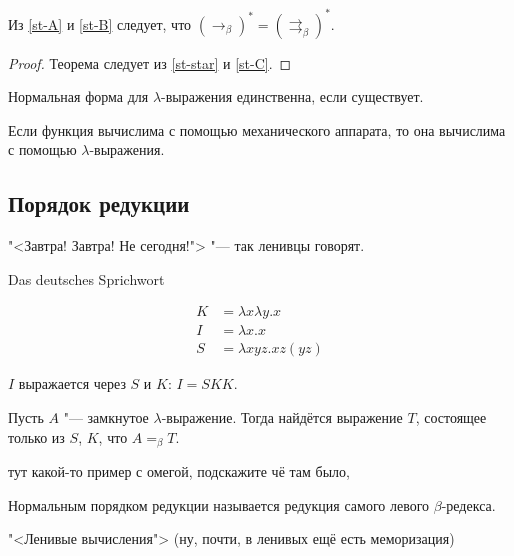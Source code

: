 \begin{statement} \label{st-C}
    Из \ref{st-A} и \ref{st-B} следует, что $(\rightarrow_{\beta})^{*} = (\rightrightarrows_{\beta})^{*}$.
\end{statement}

\begin{proof}
    Теорема  следует из \ref{st-star} и \ref{st-C}.
\end{proof}

\begin{corollary}
    Нормальная форма для $\lambda$-выражения единственна, если существует.
\end{corollary}

\begin{theorem}
    Если функция вычислима с помощью механического аппарата, то она вычислима с помощью $\lambda$-выражения.
\end{theorem}

\subsection{\texorpdfstring{Порядок редукции}{Order of reduction}}
\epigraph{"<Завтра! Завтра! Не сегодня!"> "--- так ленивцы говорят.}{Das deutsches Sprichwort}

\begin{definition}
    \begin{align*}
        K &= \lambda x \lambda y . x \\
        I &= \lambda x . x \\
        S &= \lambda x y z . x z (y z)
    \end{align*}
\end{definition}
$I$ выражается через $S$ и $K$: $I = S K K$.

\begin{statement}
    Пусть $A$ "--- замкнутое $\lambda$-выражение. Тогда найдётся выражение $T$, состоящее только из $S$, $K$, что $A =_{\beta}T$.
\end{statement}

\begin{example}
    тут какой-то пример с омегой, подскажите чё там было, \todo %
\end{example}

\begin{definition}
    Нормальным порядком редукции называется редукция самого левого $\beta$-редекса.
\end{definition}
"<Ленивые вычисления"> (ну, почти, в ленивых ещё есть меморизация)

